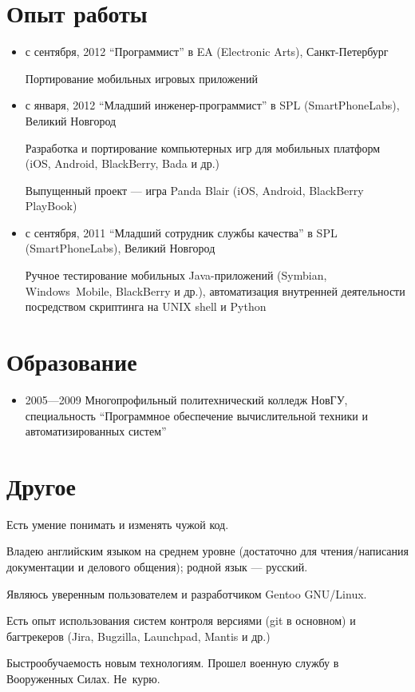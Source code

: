 \section{Опыт работы}
\begin{itemize}
\item с сентября, 2012 ``Программист'' в EA (Electronic Arts),
Санкт-Петербург

Портирование мобильных игровых приложений

\item с января, 2012 ``Младший инженер-программист'' в SPL (SmartPhoneLabs),
Великий Новгород

Разработка и портирование компьютерных игр для мобильных платформ
(iOS, Android, BlackBerry, Bada и др.)

Выпущенный проект --- игра Panda Blair (iOS, Android, BlackBerry PlayBook)

\item с сентября, 2011 ``Младший сотрудник службы качества'' в SPL (SmartPhoneLabs),
Великий Новгород

Ручное тестирование мобильных Java-приложений
(Symbian, Windows~Mobile, BlackBerry и др.),
автоматизация внутренней деятельности посредством скриптинга на UNIX shell
и Python
\end{itemize}

\section{Образование}
\begin{itemize}
\item 2005---2009 Многопрофильный политехнический колледж НовГУ, специальность
``Программное обеспечение вычислительной техники и автоматизированных систем''
\end{itemize}

\section{Другое}
Есть умение понимать и изменять чужой код.

Владею английским языком на среднем уровне (достаточно для чтения/написания
документации и делового общения); родной язык --- русский.

Являюсь уверенным пользователем и разработчиком Gentoo GNU/Linux.

Есть опыт использования систем контроля версиями (git в основном) и
багтрекеров (Jira, Bugzilla, Launchpad, Mantis и др.)

Быстрообучаемость новым технологиям.
Прошел военную службу в Вооруженных Силах.
Не~курю.
